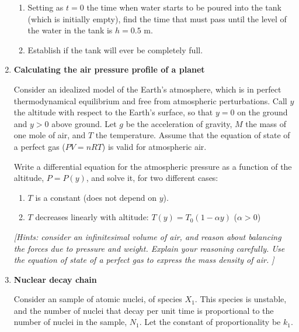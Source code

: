 \documentclass[fleqn]{article}
\begin{document}
\begin{enumerate}
\begin{enumerate}
    \item Setting as $t=0$ the time when water starts to be poured into the tank (which is initially empty), find the time that must pass until the level of the water in the tank is $h=0.5$ m.
    
    \item Establish if the tank will ever be completely full. 
  
  \end{enumerate}
  
    
  \item {\bf Calculating the air pressure profile of a planet}
  
    Consider an idealized model of the Earth's atmosphere, which is in perfect thermodynamical equilibrium and free from atmospheric perturbations.  Call $y$ the altitude with respect to the Earth's surface, so that $y=0$ on the ground and $y>0$ above ground. Let $g$ be the acceleration of gravity, $M$ the mass of one mole of air, and $T$ the temperature. Assume that the  equation of state of a perfect gas ($PV=nRT$) is valid for atmospheric air. 
  
    Write a differential equation for the atmospheric pressure as a function of the altitude, $P=P(y)$, and solve it, for two different cases:
  
    \begin{enumerate}
  
    \item $T$ is a constant (does not depend on $y$).
  
    \item $T$ decreases linearly with altitude: $T(y)=T_0(1-\alpha y)$ ($\alpha>0$)
      
      \end{enumerate}
      
    {\it [Hints: consider an infinitesimal volume of air, and reason about balancing the forces due to pressure and weight. Explain your reasoning carefully. Use the equation of state of a perfect gas to express the mass density of air.  ]}
  
  
  \item {\bf Nuclear decay chain}
  
  
  Consider an sample of atomic nuclei, of species $X_1$. This species is unstable, and the number of nuclei that decay per unit time is proportional to the number of nuclei in the sample, $N_1$. Let the constant of proportionality be $k_1$.     
  
    \begin{enumerate}
  

\end{enumerate}
\end{enumerate}
\end{document}
